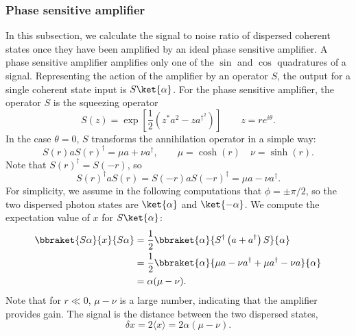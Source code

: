 \subsubsection{Phase sensitive amplifier}

In this subsection, we calculate the signal to noise ratio of dispersed coherent states once they have been amplified by an ideal phase sensitive amplifier.
A phase sensitive amplifier amplifies only one of the $\sin$ and $\cos$ quadratures of a signal.
Representing the action of the amplifier by an operator $S$, the output for a single coherent state input is $S\ket{\alpha}$.
For the phase sensitive amplifier, the operator $S$ is the squeezing operator \begin{equation}
S(z) = \exp \left[ \frac{1}{2} \left( z^* a^2 - z a^{\dagger^2} \right) \right] \qquad z=re^{i\theta} . \end{equation}
In the case $\theta = 0$, $S$ transforms the annihilation operator in a simple way: \begin{equation}
S(r)aS(r)^{\dagger} = \mu a + \nu a^{\dagger} , \qquad \mu = \cosh(r) \quad \nu = \sinh(r) . \end{equation}
Note that $S(r)^{\dagger} = S(-r)$, so \begin{equation}
S(r)^{\dagger}aS(r) = S(-r)aS(-r)^{\dagger} = \mu a - \nu a^{\dagger} . \end{equation}
For simplicity, we assume in the following computations that $\phi = \pm \pi/2$, so the two dispersed photon states are $\ket{\alpha}$ and $\ket{-\alpha}$.
We compute the expectation value of $x$ for $S\ket{\alpha}$:
\begin{align}
\bbraket{S\alpha}{x}{S\alpha} &= \frac{1}{2} \bbraket{\alpha}{S^{\dagger} \left( a+a^{\dagger} \right)S}{\alpha} \\
&= \frac{1}{2} \bbraket{\alpha}{\mu a -\nu a^{\dagger} + \mu a^{\dagger} - \nu a}{\alpha} \\
&= \alpha ( \mu - \nu ) . \end{align}
Note that for $r \ll 0$, $\mu - \nu$ is a large number, indicating that the amplifier provides gain.
The signal is the distance between the two dispersed states, \begin{equation}
\delta x =2\langle x \rangle = 2\alpha(\mu - \nu) . \end{equation}

